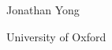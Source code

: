 \hspace{0pt}
\vfill
\begin{center}
    \Huge
    \thesistitle

    \vspace{0.6cm}

    \Large Jonathan Yong

    \vspace{0.6cm}

    \Large University of Oxford

\end{center}
\thispagestyle{empty}
\vfill
\hspace{0pt}
\newpage
